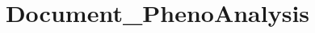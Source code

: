\documentclass[11pt, oneside]{book}
\begin{document}









\title{Document_PhenoAnalysis} %
\end{document}
